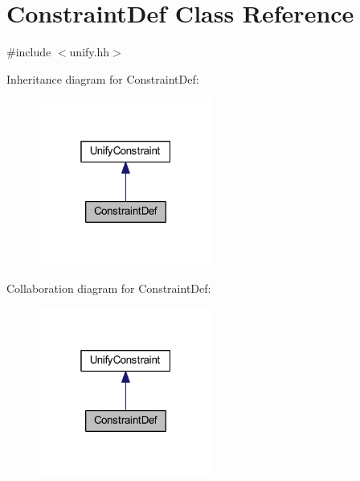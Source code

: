 \hypertarget{class_constraint_def}{}\section{Constraint\+Def Class Reference}
\label{class_constraint_def}


{\ttfamily \#include $<$unify.\+hh$>$}



Inheritance diagram for Constraint\+Def\+:
\nopagebreak
\begin{figure}[H]
\begin{center}
\leavevmode
\includegraphics[width=163pt]{class_constraint_def__inherit__graph}
\end{center}
\end{figure}


Collaboration diagram for Constraint\+Def\+:
\nopagebreak
\begin{figure}[H]
\begin{center}
\leavevmode
\includegraphics[width=163pt]{class_constraint_def__coll__graph}
\end{center}
\end{figure}
